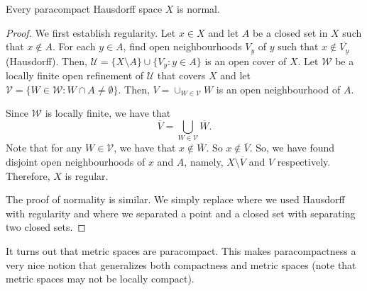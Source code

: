 \begin{theorem}
    Every paracompact Hausdorff space $X$ is normal.
\end{theorem}
\begin{proof}
    We first establish regularity. Let $x\in X$ and let $A$ be a closed set in $X$ such that $x\notin A$. For each $y\in A$, find open neighbourhoods $V_y$ of $y$ such that $x\notin \overline{V_y}$ (Hausdorff). Then, $\mathcal{U}=\{X\setminus A\}\cup \{V_y:y\in A\}$ is an open cover of $X$. Let $\mathcal{W}$ be a locally finite open refinement of $\mathcal{U}$ that covers $X$ and let $\mathcal{V}=\{W\in \mathcal{W}:W\cap A\neq\emptyset\}$. Then, $V=\cup_{W\in \mathcal{V}}W$ is an open neighbourhood of $A$. 
    
    Since $\mathcal{W}$ is locally finite, we have that 
    \[\overline{V}=\bigcup_{W\in \mathcal{V}}\overline{W}.\]
    Note that for any $W\in \mathcal{V}$, we have that $x\notin \overline{W}$. So $x\notin \overline{V}$. So, we have found disjoint open neighbourhoods of $x$ and $A$, namely, $X\setminus \overline{V}$ and $V$ respectively. Therefore, $X$ is regular.

    The proof of normality is similar. We simply replace where we used Hausdorff with regularity and where we separated a point and a closed set with separating two closed sets.
\end{proof}

It turns out that metric spaces are paracompact. This makes paracompactness a very nice notion that generalizes both compactness and metric spaces (note that metric spaces may not be locally compact).

